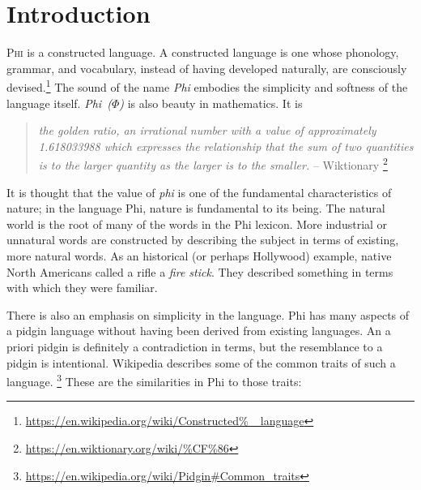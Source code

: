 \section{Introduction}
\textsc{Phi} is a constructed language. A constructed language is one whose
phonology, grammar, and vocabulary, instead of having developed naturally, are
consciously devised.\footnote{\url{https://en.wikipedia.org/wiki/Constructed%
\_language}} The sound of the name \emph{Phi} embodies the simplicity and
softness of the language itself. \emph{Phi~($\varPhi$)} is also beauty in
mathematics. It is

\begin{quote}
  \emph{the golden ratio, an irrational number with a value of approximately
  1.618033988 which expresses the relationship that the sum of two quantities
  is to the larger quantity as the larger is to the smaller.} -- Wiktionary%
  \footnote{\url{https://en.wiktionary.org/wiki/\%CF\%86}}
\end{quote}

It is thought that the value of \emph{phi} is one of the fundamental
characteristics of nature; in the language Phi, nature is fundamental to its
being. The natural world is the root of many of the words in the Phi lexicon.
More industrial or unnatural words are constructed by describing the subject in
terms of existing, more natural words. As an historical (or perhaps Hollywood)
example, native North Americans called a rifle a \emph{fire stick}. They
described something in terms with which they were familiar.

There is also an emphasis on simplicity in the language. Phi has many aspects of
a pidgin language without having been derived from existing languages. An a
priori pidgin is definitely a contradiction in terms, but the resemblance to a
pidgin is intentional. Wikipedia describes some of the common traits of such a
language.%
\footnote{\url{https://en.wikipedia.org/wiki/Pidgin\#Common_traits}}
These are the similarities in Phi to those traits:

